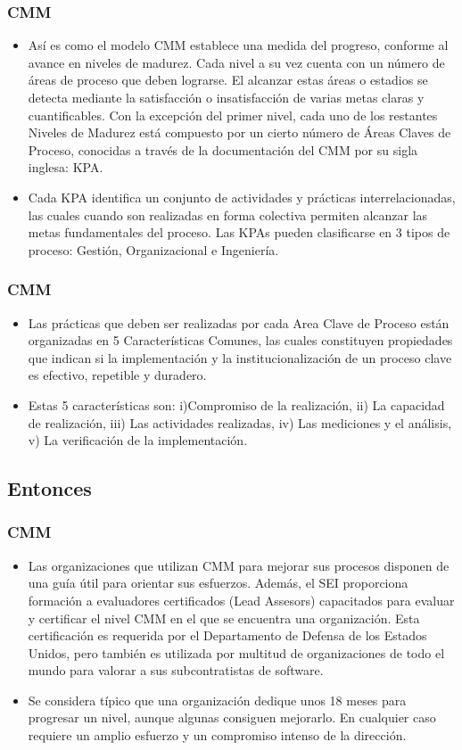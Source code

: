 \documentclass{beamer}
\begin{document}
\frame
{
	\frametitle{CMM}
	\begin{itemize}
	    \item<1-> Así es como el modelo CMM establece una medida del progreso, conforme al
avance en niveles de madurez. Cada nivel a su vez cuenta con un número de áreas
de proceso que deben lograrse. El alcanzar estas áreas o estadios se detecta
mediante la satisfacción o insatisfacción de varias metas claras y cuantificables. Con
la excepción del primer nivel, cada uno de los restantes Niveles de Madurez está
compuesto por un cierto número de Áreas Claves de Proceso, conocidas a través de
la documentación del CMM por su sigla inglesa: KPA.


    	\item<2-> Cada KPA identifica un conjunto de actividades y prácticas interrelacionadas, las
cuales cuando son realizadas en forma colectiva permiten alcanzar las metas
fundamentales del proceso. Las KPAs pueden clasificarse en 3 tipos de proceso:
Gestión, Organizacional e Ingeniería.

	\end{itemize}
}

\frame
{
  \frametitle{CMM}
  \begin{itemize}
    \item<1-> Las prácticas que deben ser realizadas por cada Area Clave de Proceso están
organizadas en 5 Características Comunes, las cuales constituyen propiedades que
indican si la implementación y la institucionalización de un proceso clave es efectivo,
repetible y duradero.

    \item<2-> Estas 5 características son: i)Compromiso de la realización, ii) La capacidad de
realización, iii) Las actividades realizadas, iv) Las mediciones y el análisis, v) La
verificación de la implementación.

  \end{itemize}
}

\subsection{Entonces}

\frame
{
  \frametitle{CMM}
  \begin{itemize}
    \item<1-> Las organizaciones que utilizan CMM para mejorar sus procesos disponen de una guía útil para orientar sus esfuerzos. Además, el SEI proporciona formación a
evaluadores certificados (Lead Assesors) capacitados para evaluar y certificar el
nivel CMM en el que se encuentra una organización. Esta certificación es requerida
por el Departamento de Defensa de los Estados Unidos, pero también es utilizada
por multitud de organizaciones de todo el mundo para valorar a sus subcontratistas
de software.
    \item<2-> Se considera típico que una organización dedique unos 18 meses para progresar un
nivel, aunque algunas consiguen mejorarlo. En cualquier caso requiere un amplio
esfuerzo y un compromiso intenso de la dirección.

  \end{itemize}
}
\end{document}
